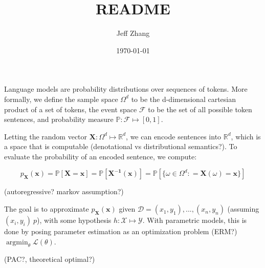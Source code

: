 \documentclass{article}
\title{README}
\author{Jeff Zhang}
\date{\today}
\begin{document}
\maketitle

Language models are probability distributions over sequences of tokens. More formally, we define the sample space ${\Omega}^d$ to be the d-dimensional cartesian product of a set of tokens, the event space $\mathcal{F}$ to be the set of all possible token sentences, and probability measure $\mathbb{P}: \mathcal{F} \mapsto [0,1].$

Letting the random vector $\mathbf{X}: {\Omega}^d \mapsto \mathbb{R}^d $, we can encode sentences into $\mathbb{R}^d$, which is a space that is computable (denotational vs distributional semantics?). To evaluate the probability of an encoded sentence, we compute:

\begin{equation}
p_\mathbf{X}(\mathbf{x}) = \mathbb{P}[\mathbf{X}=\mathbf{x}] = \mathbb{P}[\mathbf{X^{-1}}(\mathbf{x})] = \mathbb{P}[\{\omega \in {\Omega}^d: = \mathbf{X}(\omega) = \mathbf{x} \}]
\end{equation}

(autoregressive? markov assumption?)

The goal is to approximate $p_\mathbf{X}(\mathbf{x})$ given $\mathcal{D}={(x_1,y_1),...,(x_n,y_n)}$ (assuming $(x_i,y_i)~p$), with some hypothesis $h: \mathcal{X} \mapsto \mathcal {Y}$. With parametric models, this is done by posing parameter estimation as an optimization problem (ERM?) $\operatorname*{argmin}_\theta \mathcal{L}(\theta)$.

(PAC?, theoretical optimal?)
\end{document}
